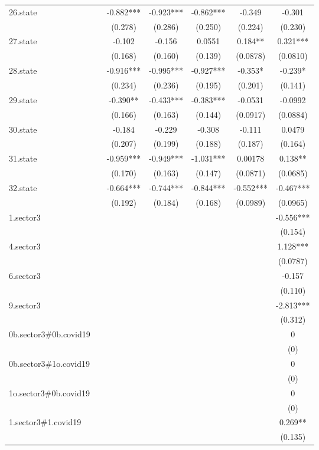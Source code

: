\documentclass[]{article}
\begin{document}
\begin{tabular}{lcccccc}
26.state &  & -0.882*** & -0.923*** & -0.862*** & -0.349 & -0.301 \\
 &  & (0.278) & (0.286) & (0.250) & (0.224) & (0.230) \\
27.state &  & -0.102 & -0.156 & 0.0551 & 0.184** & 0.321*** \\
 &  & (0.168) & (0.160) & (0.139) & (0.0878) & (0.0810) \\
28.state &  & -0.916*** & -0.995*** & -0.927*** & -0.353* & -0.239* \\
 &  & (0.234) & (0.236) & (0.195) & (0.201) & (0.141) \\
29.state &  & -0.390** & -0.433*** & -0.383*** & -0.0531 & -0.0992 \\
 &  & (0.166) & (0.163) & (0.144) & (0.0917) & (0.0884) \\
30.state &  & -0.184 & -0.229 & -0.308 & -0.111 & 0.0479 \\
 &  & (0.207) & (0.199) & (0.188) & (0.187) & (0.164) \\
31.state &  & -0.959*** & -0.949*** & -1.031*** & 0.00178 & 0.138** \\
 &  & (0.170) & (0.163) & (0.147) & (0.0871) & (0.0685) \\
32.state &  & -0.664*** & -0.744*** & -0.844*** & -0.552*** & -0.467*** \\
 &  & (0.192) & (0.184) & (0.168) & (0.0989) & (0.0965) \\
1.sector3 &  &  &  &  &  & -0.556*** \\
 &  &  &  &  &  & (0.154) \\
4.sector3 &  &  &  &  &  & 1.128*** \\
 &  &  &  &  &  & (0.0787) \\
6.sector3 &  &  &  &  &  & -0.157 \\
 &  &  &  &  &  & (0.110) \\
9.sector3 &  &  &  &  &  & -2.813*** \\
 &  &  &  &  &  & (0.312) \\
0b.sector3\#0b.covid19 &  &  &  &  &  & 0 \\
 &  &  &  &  &  & (0) \\
0b.sector3\#1o.covid19 &  &  &  &  &  & 0 \\
 &  &  &  &  &  & (0) \\
1o.sector3\#0b.covid19 &  &  &  &  &  & 0 \\
 &  &  &  &  &  & (0) \\
1.sector3\#1.covid19 &  &  &  &  &  & 0.269** \\
 &  &  &  &  &  & (0.135) \\

\end{tabular}
\end{document}
